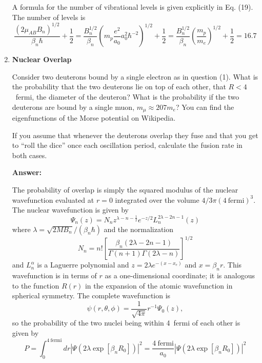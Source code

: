 \begin{enumerate}
A formula for the number of vibrational levels is given explicitly in
Eq. (19).  The number of levels is
\begin{equation}
\frac{(2 \mu_{AB} B_n)^{1/2}}{\beta_n \hbar} + \frac{1}{2} = 
\frac{B_n^{1/2}}{\beta_n} \left ( m_p \frac{e^2}{a_0} a_0^2 \hbar^{-2}
\right )^{1/2}  + \frac{1}{2} = 
\frac{B_n^{1/2}}{\beta_n} \left ( \frac{m_p}{m_e} \right )^{1/2}  +
\frac{1}{2} = 16.7
\end{equation}

\item{\bf Nuclear Overlap}

Consider two deuterons bound by a single electron as in question (1).
What is the probability that the two deuterons lie on top of each
other, {\ie} that $R<4$~fermi, the diameter of the deuteron?   What is the
probability if the two deuterons are bound by a single muon, $m_\mu
\approx 207 m_e$?  You can find the eigenfunctions of the Morse
potential on Wikipedia.

If you assume that whenever the deuterons overlap they fuse and that
you get to ``roll the dice'' once each oscillation period, calculate
the fusion rate in both cases.

{\bf Answer:}

The probability of overlap is simply the squared modulus of the
nuclear wavefunction evaluated at $r=0$ integrated over the volume
$4/3 \pi (4~\mathrm{fermi})^3$.  The nuclear wavefunction is given by
\begin{equation}
\Psi_n(z) = N_n z^{\lambda - n - \frac{1}{2}} e^{-z/2} L_n^{2\lambda-2n-1}(z)
\end{equation}
where $\lambda=\sqrt{2 M B_n}/(\beta_n \hbar)$ and the normalization
\begin{equation}
N_n=n! \left [ \frac{\beta_n (2\lambda - 2 n - 1)}{\Gamma(n+1)
    \Gamma(2\lambda - n)} \right]^{1/2} 
\end{equation}
and $L^{\alpha}_n$ is a Laguerre polynomial and $z=2\lambda
e^{-(x-x_e)}$ and $x=\beta_n r$.   This wavefunction is in terms of
$r$ as a one-dimensional coordinate; it is analogous to the function
$R(r)$ in the expansion of the atomic wavefunction in spherical
symmetry.   The complete wavefunction is
\begin{equation}
\psi(r,\theta,\phi) = \frac{1}{\sqrt{4\pi}} r^{-1} \Psi_0(z) ,
\end{equation}
so the probability of the two nuclei being within 4~fermi of each
other is given by
\begin{equation}
P = \int_0^{4~\mathrm{fermi}}  d r \left | \Psi \left (2 \lambda \exp
  \left [ \beta_n R_0 \right ] \right ) \right |^2 = \frac{4~\mathrm{fermi}}{a_0} \left | \Psi\left(2 \lambda \exp
  \left [ \beta_n R_0 \right ]\right) \right |^2
\end{equation}


\end{enumerate}
